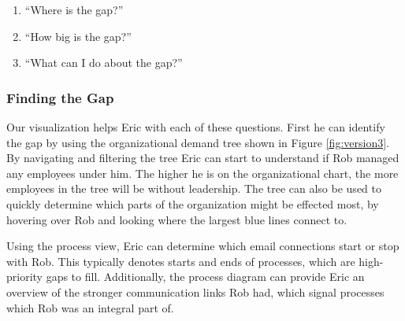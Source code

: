 \documentclass[journal]{vgtc}                %
\begin{document}
\begin{enumerate}
\item ``Where is the gap?''
\item ``How big is the gap?''
\item ``What can I do about the gap?''
\end{enumerate}

\subsubsection{Finding the Gap}
Our visualization helps Eric with each of these questions.  First he can identify the gap by using the organizational demand tree shown in Figure \ref{fig:version3}.  By navigating and filtering the tree Eric can start to understand if Rob managed any employees under him. The higher he is on the organizational chart, the more employees in the tree will be without leadership. The tree can also be used to quickly determine which parts of the organization might be effected most, by hovering over Rob and looking where the largest blue lines connect to.

Using the process view, Eric can determine which email connections start or stop with Rob.  This typically denotes starts and ends of processes, which are high-priority gaps to fill.  Additionally, the process diagram can provide Eric an overview of the stronger communication links Rob had, which signal processes which Rob was an integral part of.
\end{document}
